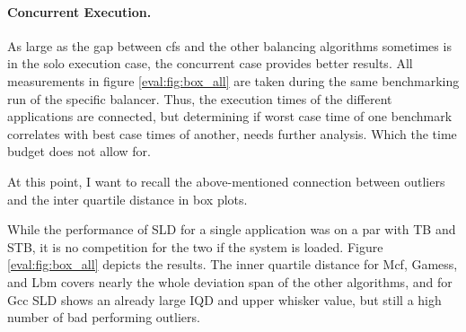 \paragraph{Concurrent Execution.}
As large as the gap between \gls{cfs} and the other balancing algorithms
sometimes is in the solo execution case, the concurrent case provides better results.
All measurements in figure \ref{eval:fig:box_all} are taken during the same
benchmarking run of the specific balancer.
Thus, the execution times of the different applications are connected, but
determining if worst case time of one benchmark correlates with best case times
of another, needs further analysis.
Which the time budget does not allow for.

At this point, I want to recall the above-mentioned connection between outliers
and the inter quartile distance in box plots.

While the performance of SLD for a single application was on a par with TB and
STB, it is no competition for the two if the system is loaded.
Figure \ref{eval:fig:box_all} depicts the results.
The inner quartile distance for Mcf, Gamess, and Lbm covers nearly the whole
deviation span of the other algorithms, and for Gcc SLD shows an already large
IQD and upper whisker value, but still a high number of bad performing outliers.

